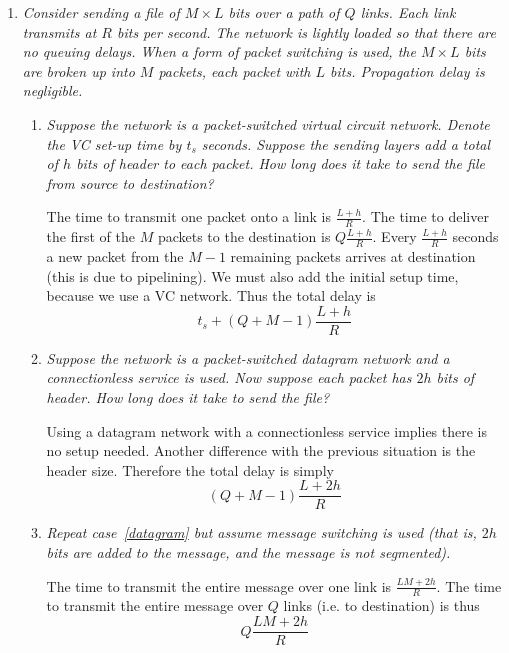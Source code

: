 \documentclass[11pt,a4paper]{article}
\begin{document}
\begin{enumerate}

  \item \emph{Consider sending a file of \(M \times L\) bits over a
    path of \(Q\) links. Each link transmits at \(R\) bits per
    second. The network is lightly loaded so that there are no queuing
    delays. When a form of packet switching is used, the \(M \times
    L\) bits are broken up into \(M\) packets, each packet with \(L\)
    bits. Propagation delay is negligible.}
    \begin{enumerate}

      \item \emph{Suppose the network is a packet-switched virtual
        circuit network. Denote the VC set-up time by \(t_s\)
        seconds. Suppose the sending layers add a total of \(h\) bits
        of header to each packet. How long does it take to send the
        file from source to destination?}

        The time to transmit one packet onto a link is \(\frac{L +
          h}{R}\). The time to deliver the first of the \(M\) packets
        to the destination is \(Q{\frac{L+h}{R}}\). Every
        \(\frac{L+h}{R}\) seconds a new packet from the \(M-1\)
        remaining packets arrives at destination (this is due to
        pipelining). We must also add the initial setup time, because
        we use a VC network. Thus the total delay is
        \[
          t_{s} + (Q + M - 1){\frac{L+h}{R}}
        \]

      \item \label{datagram} \emph{Suppose the network is a
        packet-switched datagram network and a connectionless service
        is used. Now suppose each packet has \(2h\) bits of
        header. How long does it take to send the file?}

        Using a datagram network with a connectionless service implies
        there is no setup needed. Another difference with the previous
        situation is the header size. Therefore the total delay is
        simply
        \[
          (Q + M - 1){\frac{L + 2h}{R}}
        \]

      \item \emph{Repeat case~\ref{datagram} but assume message
        switching is used (that is, \(2h\) bits are added to the
        message, and the message is not segmented).}

        The time to transmit the entire message over one link is
        \(\frac{L M + 2h}{R}\). The time to transmit the entire
        message over \(Q\) links (i.e. to destination) is thus
        \[
          Q{\frac{L M + 2h}{R}}
        \]
 

\end{enumerate}
\end{enumerate}
\end{document}
